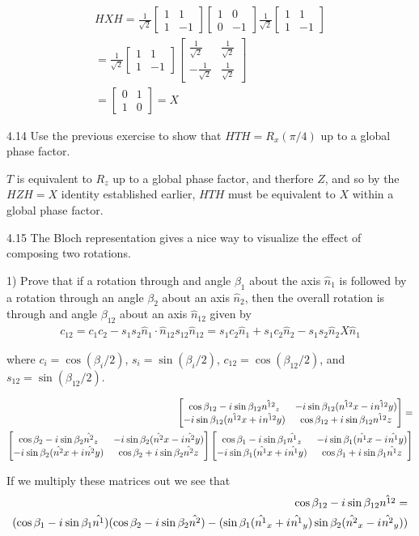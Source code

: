 \documentclass[12pt, letterpaper, twoside]{article}
\newcommand{\iu}{{i\mkern1mu}}
\newcommand{\Hadamard}{\frac{1}{\sqrt{2}}
\begin{bmatrix}
    1 & 1 \\
    1 & -1
\end{bmatrix}}
\newcommand{\twoXtwo}[4]{\begin{bmatrix}
    #1 & #3 \\
    #2 & #4
\end{bmatrix}}
\newcommand{\Rnparam}[2]{\twoXtwo{
    \cos{#1} - \iu \sin{#1}#2_z
    }{
        -\iu \sin{#1}(#2x + \iu #2y)
    }{
        -\iu \sin{#1}(#2x - \iu #2y)
    }{
        \cos{#1} + \iu \sin{#1}#2z
        }}
\newcommand{\pauliZ}{\twoXtwo{1}{0}{0}{-1}}
\newcommand{\sqrhat}{\frac{1}{\sqrt{2}}}
\begin{document}
\begin{subequations}
	\begin{align}
		HXH = \Hadamard \pauliZ \Hadamard                         \\
		= \Hadamard \twoXtwo{\sqrhat}{-\sqrhat}{\sqrhat}{\sqrhat} \\
		= \twoXtwo{0}{1}{1}{0} = X
	\end{align}
\end{subequations}

4.14 Use the previous exercise to show that $HTH = R_x(\pi/4)$ up to a global phase factor.

$T$ is equivalent to $R_z$ up to a global phase factor, and therfore $Z$, and so by the $HZH = X$ identity established earlier, $HTH$ must be equivalent to $X$ within a global phase factor.

4.15 The Bloch representation gives a nice way to visualize the effect of composing two rotations.

1) Prove that if a rotation through and angle $\beta_1$ about the axis $\hat{n}_1$ is followed by a rotation through an angle $\beta_2$ about an axis $\hat{n}_2$, then the overall rotation is through and angle $\beta_{12}$ about an axis $\hat{n}_{12}$ given by
\begin{subequations}
    \begin{align}
        c_{12} = c_1c_2 - s_1s_2\hat{n}_1 \cdot \hat{n}_{12}
        s_{12}\hat{n}_{12} = s_1c_2\hat{n}_1 + s_1c_2\hat{n}_2 - s_1s_2\hat{n}_2 X \hat{n}_1
	\end{align}
\end{subequations}

where $c_i = \cos{(\beta_i/2)}$, $s_i = \sin{(\beta_i/2)}$, $c_{12} = \cos{(\beta_{12}/2)}$, and $s_{12} = \sin{(\beta_{12}/2)}$.

\begin{subequations}
\begin{align}
\Rnparam{\beta_{12}}{\hat{n^{12}}} = \\
\Rnparam{\beta_{2}}{\hat{n^2}} \Rnparam{\beta_{1}}{\hat{n^1}} \\
\end{align}
\end{subequations}

If we multiply these matrices out we see that
\begin{align*}
\cos{\beta_{12}} - \iu \sin{\beta_{12}}\hat{n^{12}} = \\
(\cos{\beta_{1}} - \iu \sin{\beta_{1}}\hat{n^{1}})(\cos{\beta_{2}} - \iu \sin{\beta_{2}}\hat{n^{2}}) - (\sin{\beta_{1}}(\hat{n^1}_x + \iu \hat{n^1}_y)\sin{\beta_{2}}(\hat{n^2}_x - \iu \hat{n^2}_y))
\end{align*}
\end{document}
